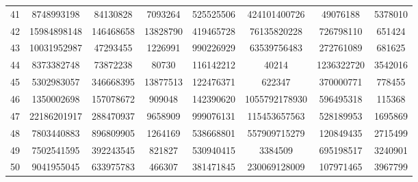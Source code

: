 \documentclass[solution, letterpaper]{cs121}
\begin{document}
\begin{center}
\begin{tabular}{ c |c c c c c c c}
41 & 8748993198 & 84130828 & 7093264 & 525525506 & 424101400726 & 49076188 & 5378010 \\
42 & 15984898148 & 146468658 & 13828790 & 419465728 & 76135820228 & 726798110 & 651424 \\
43 & 10031952987 & 47293455 & 1226991 & 990226929 & 63539756483 & 272761089 & 681625 \\
44 & 8373382748 & 73872238 & 80730 & 116142212 & 40214 & 1236322720 & 3542016 \\
45 & 5302983057 & 346668395 & 13877513 & 122476371 & 622347 & 370000771 & 778455 \\
46 & 1350002698 & 157078672 & 909048 & 142390620 & 1055792178930 & 596495318 & 115368 \\
47 & 22186201917 & 288470937 & 9658909 & 999076131 & 115453657563 & 528189953 & 1695869 \\
48 & 7803440883 & 896809905 & 1264169 & 538668801 & 557909715279 & 120849435 & 2715499 \\
49 & 7502541595 & 392243545 & 821827 & 530940415 & 3384509 & 695198517 & 3240901 \\
50 & 9041955045 & 633975783 & 466307 & 381471845 & 230069128009 & 107971465 & 3967799 \\
\end{tabular}
\end{center}
\end{document}
